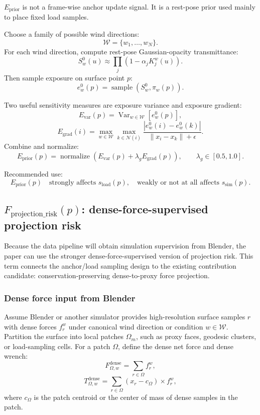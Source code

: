 \documentclass[11pt,a4paper]{article}
\newcommand{\normalize}{\operatorname{normalize}}
\newcommand{\Var}{\operatorname{Var}}
\begin{document}
$E_{\mathrm{prior}}$ is not a frame-wise anchor update signal. It is a rest-pose prior used mainly to place fixed load samples.

Choose a family of possible wind directions:
\[
\mathcal{W}=\{w_1,\dots,w_N\}.
\]
For each wind direction, compute rest-pose Gaussian-opacity transmittance:
\[
S_w^0(u)\approx\prod_j\left(1-\alpha_jK_j^w(u)\right).
\]
Then sample exposure on surface point $p$:
\[
e_w^0(p)=\operatorname{sample}(S_w^0,\pi_w(p)).
\]

Two useful sensitivity measures are exposure variance and exposure gradient:
\[
E_{\mathrm{var}}(p)=\Var_{w\in\mathcal{W}}[e_w^0(p)],
\]
\[
E_{\mathrm{grad}}(i)=
\max_{w\in\mathcal{W}}\max_{k\in\mathcal{N}(i)}
\frac{|e_w^0(i)-e_w^0(k)|}{\|x_i-x_k\|+\epsilon}.
\]
Combine and normalize:
\[
E_{\mathrm{prior}}(p)=
\normalize\left(E_{\mathrm{var}}(p)+\lambda_gE_{\mathrm{grad}}(p)\right),
\qquad \lambda_g\in[0.5,1.0].
\]

Recommended use:
\[
E_{\mathrm{prior}}(p)\quad\text{strongly affects }s_{\mathrm{load}}(p),\quad\text{weakly or not at all affects }s_{\mathrm{sim}}(p).
\]


\subsection{$F_{\mathrm{projection\_risk}}(p)$: dense-force-supervised projection risk}

Because the data pipeline will obtain simulation supervision from Blender, the paper can use the stronger dense-force-supervised version of projection risk. This term connects the anchor/load sampling design to the existing contribution candidate: conservation-preserving dense-to-proxy force projection.

\subsubsection{Dense force input from Blender}
Assume Blender or another simulator provides high-resolution surface samples $r$ with dense forces $f_r^w$ under canonical wind direction or condition $w\in\mathcal{W}$. Partition the surface into local patches $\Omega_m$, such as proxy faces, geodesic clusters, or load-sampling cells. For a patch $\Omega$, define the dense net force and dense wrench:
\[
F_{\Omega,w}^{\mathrm{dense}}=\sum_{r\in\Omega} f_r^w,
\]
\[
T_{\Omega,w}^{\mathrm{dense}}=\sum_{r\in\Omega}(x_r-c_\Omega)\times f_r^w,
\]
where $c_\Omega$ is the patch centroid or the center of mass of dense samples in the patch.
\end{document}
